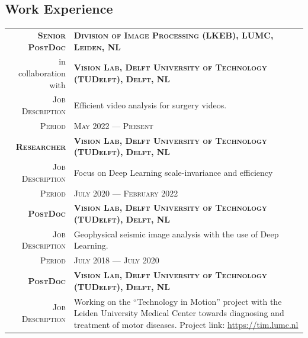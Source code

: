 \documentclass[a4paper, oneside, final]{scrartcl}
\newcommand{\gray}{\rowcolor[gray]{.90}}
\begin{document}
\begin{center}
		\section{Work Experience}
		\begin{tabular}{r@{\hskip 0.3in}p{12.3cm}}
			\gray \textsc{\textbf{Senior PostDoc}} & \textsc{\textbf{Division of Image Processing (LKEB), LUMC, Leiden, NL}}\\
			 \gray in collaboration with           & \textsc{\textbf{Vision Lab, Delft University of Technology (TUDelft), Delft, NL}}\\
			\textsc{Job Description}            & Efficient video analysis for surgery videos.\\ 
			\textsc{Period}                     & \textsc{May 2022 --- Present} 
            \vspace{5px}\\
			\gray \textsc{\textbf{Researcher}} & \textsc{\textbf{Vision Lab, Delft University of Technology (TUDelft), Delft, NL}}\\
			\textsc{Job Description}            & Focus on Deep Learning scale-invariance and efficiency\\
			\textsc{Period}                     & \textsc{July 2020 --- February 2022} 
            \vspace{5px}\\
			\gray \textsc{\textbf{PostDoc}}     & \textsc{\textbf{Vision Lab, Delft University of Technology (TUDelft), Delft, NL}}\\
			\textsc{Job Description}            & Geophysical seismic image analysis with the use of Deep Learning. \\
			\textsc{Period}                     & \textsc{July 2018 --- July 2020} 
            \vspace{5px}\\
			\gray \textsc{\textbf{PostDoc}}     & \textsc{\textbf{Vision Lab, Delft University of Technology (TUDelft), Delft, NL}}\\
			\textsc{Job Description}            & Working on the ``Technology in Motion'' project with the Leiden University Medical Center 
				towards diagnosing and treatment of motor diseases.
				Project link: \href{https://tim.lumc.nl}{https://tim.lumc.nl}\\

\end{tabular}
\end{center}
\end{document}
